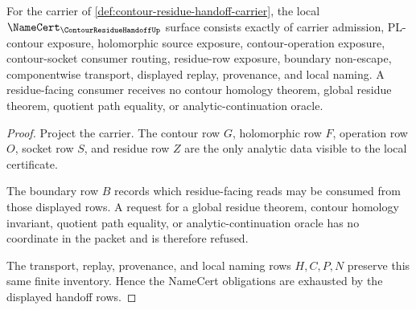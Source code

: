 \begin{theorem}
\label{thm:contour-residue-handoff-namecert-obligations}
For the carrier of \autoref{def:contour-residue-handoff-carrier}, the local $\NameCert_{\ContourResidueHandoffUp}$ surface consists exactly of carrier admission, PL-contour exposure, holomorphic source exposure, contour-operation exposure, contour-socket consumer routing, residue-row exposure, boundary non-escape, componentwise transport, displayed replay, provenance, and local naming. A residue-facing consumer receives no contour homology theorem, global residue theorem, quotient path equality, or analytic-continuation oracle.
\end{theorem}
\begin{proof}
Project the carrier. The contour row $G$, holomorphic row $F$, operation row $O$, socket row $S$, and residue row $Z$ are the only analytic data visible to the local certificate.

The boundary row $B$ records which residue-facing reads may be consumed from those displayed rows. A request for a global residue theorem, contour homology invariant, quotient path equality, or analytic-continuation oracle has no coordinate in the packet and is therefore refused.

The transport, replay, provenance, and local naming rows $H,C,P,N$ preserve this same finite inventory. Hence the NameCert obligations are exhausted by the displayed handoff rows.
\end{proof}

